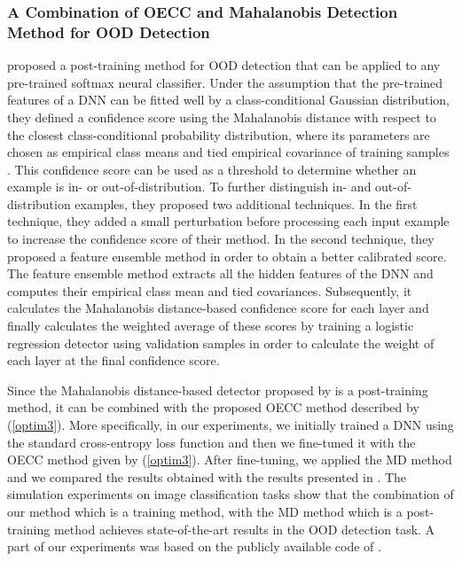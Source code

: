 \documentclass{article} \usepackage{iclr2020_conference,times}
\begin{document}
\subsubsection{A Combination of OECC and Mahalanobis Detection Method for OOD Detection}
\citet{Lee:2018:SUF:3327757.3327819} proposed a post-training method for OOD detection that can be applied to any pre-trained softmax neural classifier. Under the assumption that the pre-trained features of a DNN can be fitted well by a class-conditional Gaussian distribution, they defined a confidence score using the Mahalanobis distance with respect to the closest class-conditional probability distribution, where its parameters are chosen as empirical class means and tied empirical covariance of training samples \citep{Lee:2018:SUF:3327757.3327819}. This confidence score can be used as a threshold to determine whether an example is in- or out-of-distribution. To further distinguish in- and out-of-distribution examples, they proposed two additional techniques. In the first technique, they added a small perturbation before processing each input example to increase the confidence score of their method. In the second technique, they proposed a feature ensemble method in order to obtain a better calibrated score. The feature ensemble method extracts all the hidden features of the DNN and computes their empirical class mean and tied covariances. Subsequently, it calculates the Mahalanobis distance-based confidence score for each layer and finally calculates the weighted average of these scores by training a logistic regression detector using validation samples in order to calculate the weight of each layer at the final confidence score.   

Since the Mahalanobis distance-based detector proposed by \citet{Lee:2018:SUF:3327757.3327819} is a post-training method, it can be combined with the proposed OECC method described by (\ref{optim3}). More specifically, in our experiments, we initially trained a DNN using the standard cross-entropy loss function and then we fine-tuned it with the OECC method given by (\ref{optim3}). After fine-tuning, we applied the MD method and we compared the results obtained with the results presented in \citet{Lee:2018:SUF:3327757.3327819}. The simulation experiments on image classification tasks show that the combination of our method which is a training method, with the MD method which is a post-training method achieves state-of-the-art results in the OOD detection task. A part of our experiments was based on the publicly available code of \citet{Lee:2018:SUF:3327757.3327819}.
\end{document}
